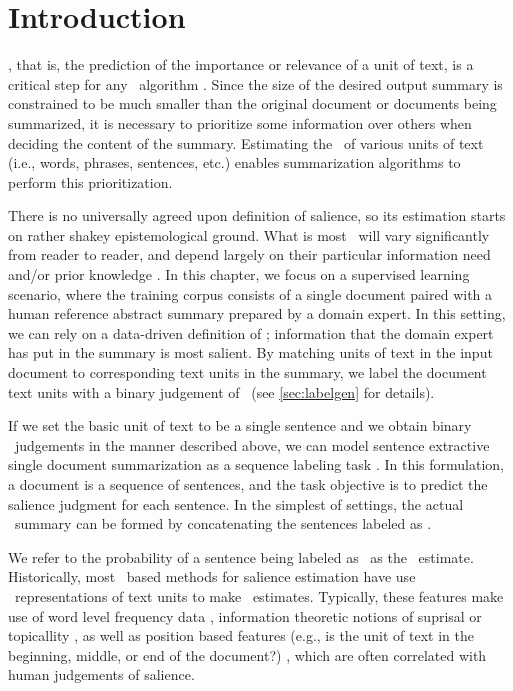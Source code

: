 \section{Introduction}

\Salienceestimation, that is, the prediction of 
the importance or relevance of a unit of text, is a critical step
for any \textsummarization~algorithm \citep{nenkova2011automatic}. Since the size of 
the desired output summary is constrained to be much smaller than the original
document or documents being summarized, it is necessary to prioritize 
some information over others when deciding the content of  the summary. Estimating the \salience~of various units of text (i.e., words, phrases, sentences, etc.) enables summarization algorithms to perform this 
prioritization.

 There is no universally agreed upon 
definition of salience, so its estimation starts on rather shakey 
epistemological ground. What is most \salient~will vary significantly from 
reader to reader,
and depend largely on their particular information need and/or prior knowledge
\citep{jones1999automatic}.
In this chapter, we focus on a supervised learning scenario, where 
the training corpus consists of a single document paired with a human reference abstract summary prepared
by a domain expert. In this setting,  we can rely on a data-driven definition
of \salience;
information that the domain expert has put in the summary is most salient.
By matching units of text in the input document to corresponding text units
in the summary, we label the document text units with a binary judgement of
\salience~(see \autoref{sec:labelgen} for details). 

If we set the basic unit of text to be a single sentence and we obtain binary
\salience~judgements in the manner described above, we can model
sentence extractive single document summarization as a sequence labeling 
task \citep{conroy2001}. In this formulation, a document is a sequence of 
sentences, and the task objective is to predict the salience judgment
for each sentence. In the simplest of settings, the actual \extract~summary
can be formed by concatenating the sentences labeled as \salient.


We refer to the probability of a sentence being labeled as \salient~as the 
\salience~estimate.  Historically, most \machinelearning~based methods for salience estimation
have use \featurebased~representations of text units to make 
\salience~estimates. Typically, these features make use of word level 
frequency data \cite{a,b,c}, information theoretic notions
of suprisal or topicallity \cite{x,y}, as well as position based features
(e.g., is the unit of text in the beginning, middle, or end of the document?)
\cite{position},
which are often correlated with human judgements of salience.


